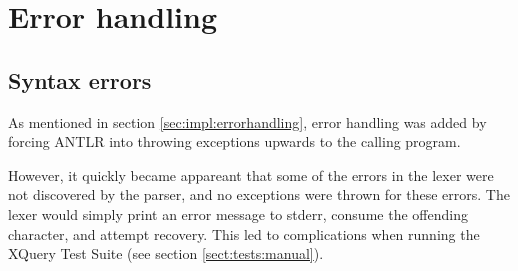 \section{Error handling}
\subsection{Syntax errors}
\label{sect:error_handling:syntax_errors}
As mentioned in section \ref{sec:impl:errorhandling}, error handling was added
by forcing ANTLR into throwing exceptions upwards to the calling program.

However, it quickly became appareant that some of the errors in the lexer were
not discovered by the parser, and no exceptions were thrown for these errors. The
lexer would simply print an error message to stderr, consume the offending
character, and attempt recovery. This led to complications when running the
XQuery Test Suite (see section \ref{sect:tests:manual}).